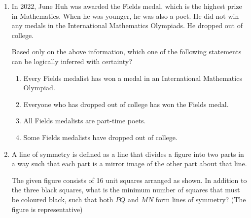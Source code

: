 \documentclass[journal,12pt,onecolumn]{IEEEtran}
\theoremstyle{remark}
\begin{document}
\begin{enumerate}
\begin{enumerate}[label=\Alph*.]
\end{enumerate}

\item In 2022, June Huh was awarded the Fields medal, which is the highest prize in Mathematics.  
When he was younger, he was also a poet. He did not win any medals in the International Mathematics Olympiads.  
He dropped out of college.  

Based only on the above information, which one of the following statements can be logically inferred with certainty?\hfill{}

\begin{enumerate}[label=\Alph*.]
\item Every Fields medalist has won a medal in an International Mathematics Olympiad.
\item Everyone who has dropped out of college has won the Fields medal.
\item All Fields medalists are part-time poets.
\item Some Fields medalists have dropped out of college.
\end{enumerate}

\item A line of symmetry is defined as a line that divides a figure into two parts in a way such that each part is a mirror image of the other part about that line.  

The given figure consists of 16 unit squares arranged as shown. In addition to the three black squares, what is the minimum number of squares that must be coloured black, such that both $PQ$ and $MN$ form lines of symmetry? (The figure is representative)\hfill{}


\end{enumerate}
\end{document}
